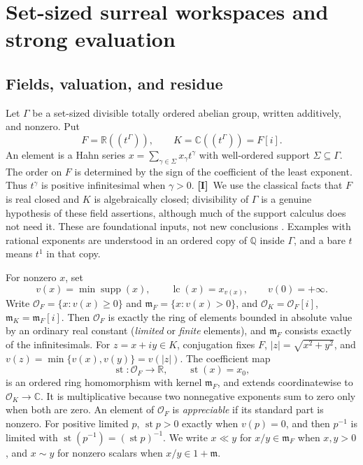 \documentclass[11pt,oneside]{article}
\numberwithin{equation}{section}
\theoremstyle{plain}
\theoremstyle{definition}
\theoremstyle{remark}
\newcommand{\R}{\mathbb R}
\newcommand{\C}{\mathbb C}
\newcommand{\Q}{\mathbb Q}
\newcommand{\OO}{\mathcal O}
\newcommand{\mm}{\mathfrak m}
\DeclareMathOperator{\st}{st}
\DeclareMathOperator{\lc}{lc}
\DeclareMathOperator{\supp}{supp}
\newcommand{\abs}[1]{\left|#1\right|}
\newcommand{\TI}{\textcolor{TierI}{\textsf{\bfseries[I]}}}
\begin{document}
\section{Set-sized surreal workspaces and strong evaluation}\label{qgs:sec:workspace}

\subsection{Fields, valuation, and residue}\label{qgs:sec:fields}
Let $\Gamma$ be a set-sized divisible totally ordered abelian group, written additively, and nonzero. Put
\begin{equation}\label{qgs:eq:workspace}
 F=\R((t^\Gamma)),\qquad K=\C((t^\Gamma))=F[i].
\end{equation}
An element is a Hahn series $x=\sum_{\gamma\in\Sigma}x_\gamma t^\gamma$ with well-ordered support $\Sigma\subseteq\Gamma$. The order on $F$ is determined by the sign of the coefficient of the least exponent. Thus $t^\gamma$ is positive infinitesimal when $\gamma>0$. \TI\ We use the classical facts that $F$ is real closed and $K$ is algebraically closed; divisibility of $\Gamma$ is a genuine hypothesis of these field assertions, although much of the support calculus does not need it. These are foundational inputs, not new conclusions \cite{Gonshor,vdDE}. Examples with rational exponents are understood in an ordered copy of $\Q$ inside $\Gamma$, and a bare $t$ means $t^1$ in that copy.

For nonzero $x$, set
\begin{equation}
 v(x)=\min\supp(x),\qquad
 \lc(x)=x_{v(x)},\qquad v(0)=+\infty.
\end{equation}
Write $\OO_F=\{x:v(x)\ge0\}$ and $\mm_F=\{x:v(x)>0\}$, and $\OO_K=\OO_F[i]$, $\mm_K=\mm_F[i]$. Then $\OO_F$ is exactly the ring of elements bounded in absolute value by an ordinary real constant (\emph{limited} or \emph{finite} elements), and $\mm_F$ consists exactly of the infinitesimals. For $z=x+iy\in K$, conjugation fixes $F$, $\abs z=\sqrt{x^2+y^2}$, and $v(z)=\min\{v(x),v(y)\}=v(\abs z)$. The coefficient map
\begin{equation}
 \st:\OO_F\longrightarrow\R,\qquad \st(x)=x_0,
\end{equation}
is an ordered ring homomorphism with kernel $\mm_F$, and extends coordinatewise to $\OO_K\to\C$. It is multiplicative because two nonnegative exponents sum to zero only when both are zero. An element of $\OO_F$ is \emph{appreciable} if its standard part is nonzero. For positive limited $p$, $\st p>0$ exactly when $v(p)=0$, and then $p^{-1}$ is limited with $\st(p^{-1})=(\st p)^{-1}$. We write $x\ll y$ for $x/y\in\mm_F$ when $x,y>0$, and $x\sim y$ for nonzero scalars when $x/y\in1+\mm$.
\end{document}
